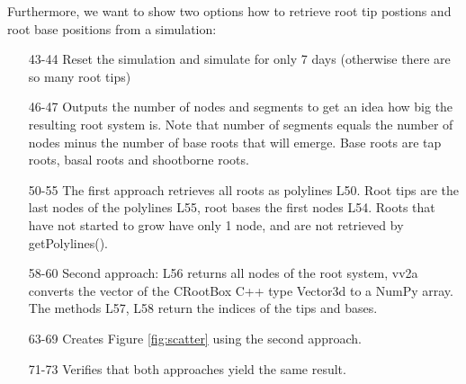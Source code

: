 \documentclass[a4paper]{article}
\begin{document}
Furthermore, we want to show two options how to retrieve root tip postions and root base positions from a simulation:



\begin{itemize}

\item[43-44] Reset the simulation and simulate for only 7 days (otherwise there are so many root tips)

\item[46-47] Outputs the number of nodes and segments to get an idea how big the resulting root system is. 
Note that number of segments equals the number of nodes minus the number of base roots that will emerge. Base roots are tap roots, basal roots and shootborne roots.

\item[50-55] The first approach retrieves all roots as polylines L50. Root tips are the last nodes of the polylines L55, root bases the first nodes L54. 
Roots that have not started to grow have only 1 node, and are not retrieved by getPolylines().

\item[58-60] Second approach: L56 returns all nodes of the root system, vv2a converts the vector of the CRootBox C++ type Vector3d to a NumPy array. 
The methods L57, L58 return the indices of the tips and bases. 

\item[63-69] Creates Figure \ref{fig:scatter} using the second approach.

\item[71-73] Verifies that both approaches yield the same result.

\end{itemize}
\end{document}
